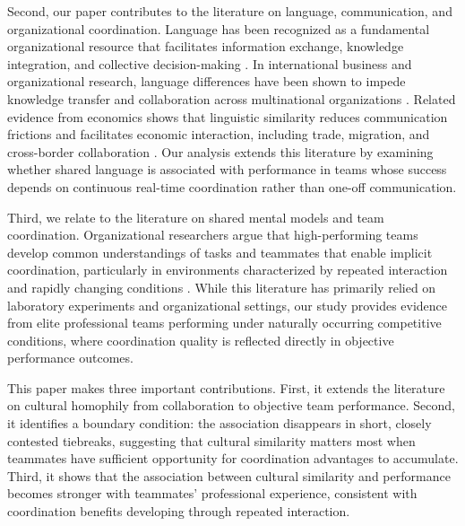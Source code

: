 \documentclass[10pt]{article}
\begin{document}
Second, our paper contributes to the literature on language, communication, and organizational coordination. Language has been recognized as a fundamental organizational resource that facilitates information exchange, knowledge integration, and collective decision-making \citep{wernerfelt2004}. In international business and organizational research, language differences have been shown to impede knowledge transfer and collaboration across multinational organizations \citep{marschanpiekkari1999,feelyharzing2003}. Related evidence from economics shows that linguistic similarity reduces communication frictions and facilitates economic interaction, including trade, migration, and cross-border collaboration \citep[e.g.,][]{melitztoubal2014}. Our analysis extends this literature by examining whether shared language is associated with performance in teams whose success depends on continuous real-time coordination rather than one-off communication. 

Third, we relate to the literature on shared mental models and team coordination. Organizational researchers argue that high-performing teams develop common understandings of tasks and teammates that enable implicit coordination, particularly in environments characterized by repeated interaction and rapidly changing conditions \citep{cannonbowers1993,klimoski1994,mathieu2000}. While this literature has primarily relied on laboratory experiments and organizational settings, our study provides evidence from elite professional teams performing under naturally occurring competitive conditions, where coordination quality is reflected directly in objective performance outcomes.


This paper makes three important contributions. First, it extends the literature on cultural homophily from collaboration to objective team performance. Second, it identifies a boundary condition: the association disappears in short, closely contested tiebreaks, suggesting that cultural similarity matters most when teammates have sufficient opportunity for coordination advantages to accumulate. Third, it shows that the association between cultural similarity and performance becomes stronger with teammates' professional experience, consistent with coordination benefits developing through repeated interaction. 
\end{document}
